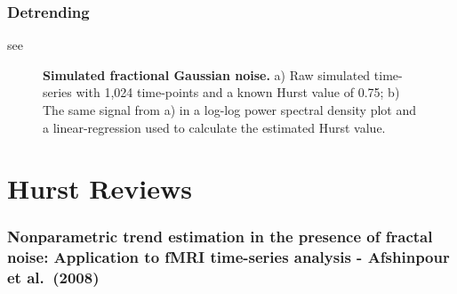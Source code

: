 \documentclass[
  sn-vancouver,
  Numbered,
  referee,
  lineno]{sn-jnl}
\begin{document}
\subsubsection{Detrending}\label{detrending}

see \citet{tanabeComparisonDetrendingMethods2002}

\label{cell-fig-scaleinvariance}
\begin{figure}[H]


\caption{\label{fig-scaleinvariance}\textbf{Simulated fractional
Gaussian noise.} a) Raw simulated time-series with 1,024 time-points and
a known Hurst value of 0.75; b) The same signal from a) in a log-log
power spectral density plot and a linear-regression used to calculate
the estimated Hurst value.}

\end{figure}%

\section{Hurst Reviews}\label{hurst-reviews}

\subsubsection{\texorpdfstring{Nonparametric trend estimation in the
presence of fractal noise: Application to fMRI time-series analysis -
Afshinpour et al.~(2008)
\citep{afshinpourNonparametricTrendEstimation2008}}{Nonparametric trend estimation in the presence of fractal noise: Application to fMRI time-series analysis - Afshinpour et al.~(2008) {[}@afshinpourNonparametricTrendEstimation2008{]}}}\label{nonparametric-trend-estimation-in-the-presence-of-fractal-noise-application-to-fmri-time-series-analysis---afshinpour-et-al.-2008-afshinpournonparametrictrendestimation2008}
\end{document}
